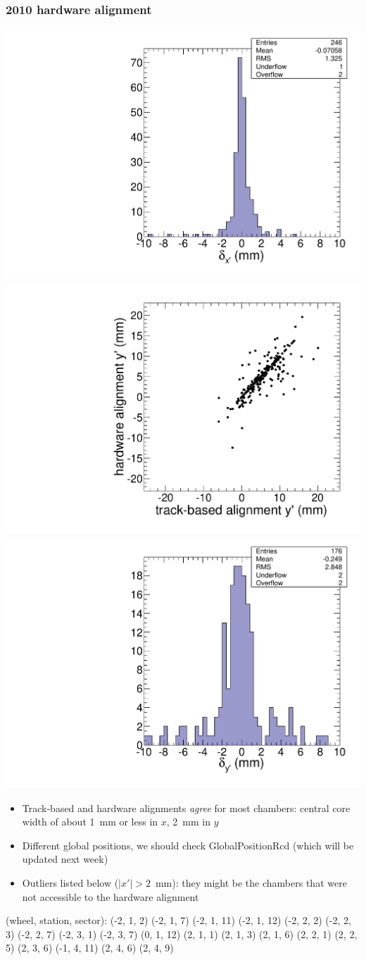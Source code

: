 \documentclass[compress]{beamer}
\begin{document}
\begin{frame}
\frametitle{2010 hardware alignment}

\includegraphics[width=0.33\linewidth]{hardware_x_realdiff.pdf}
\includegraphics[width=0.33\linewidth]{hardware_y_corr.pdf}
\includegraphics[width=0.33\linewidth]{hardware_y_diff.pdf}

\begin{itemize}
\item Track-based and hardware alignments {\it agree} for most
  chambers: central core width of about 1~mm or less in $x$, 2~mm in $y$

\item Different global positions, we should check GlobalPositionRcd
  (which will be updated next week)

\item Outliers listed below ($|x'| > 2$~mm): they might be the
  chambers that were not accessible to the hardware alignment
\end{itemize}

{\tiny
(wheel, station, sector): (-2, 1, 2) (-2, 1, 7) (-2, 1, 11) (-2, 1,
12) (-2, 2, 2) (-2, 2, 3) (-2, 2, 7) (-2, 3, 1) (-2, 3, 7) (0, 1, 12)
(2, 1, 1) (2, 1, 3) (2, 1, 6) (2, 2, 1) (2, 2, 5) (2, 3, 6) (-1, 4,
11) (2, 4, 6) (2, 4, 9)}
\end{frame}
\end{document}
